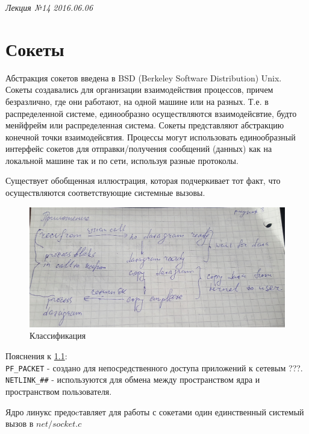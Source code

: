 \clearpage
\begin{flushright}
	\textit{Лекция №14}
	\textit{2016.06.06}
\end{flushright}

\chapter{Сокеты}

Абстракция сокетов введена в BSD (Berkeley Software Distribution) Unix. Сокеты создавались для организации взаимодействия процессов, причем безразлично, где они работают, на одной машине или на разных. Т.е. в распределенной системе, единообразно осуществляются взаимодейсвтие, будто менйфрейм или распределенная система. Сокеты представляют абстракцию конечной точки взаимодейсвтия. Процессы могут использовать единообразный интерфейс сокетов для отправки/получения сообщений (данных) как на локальной машине так и по сети, используя разные протоколы. 

Существует обобщенная иллюстрация, которая подчеркивает тот факт, что осуществляются соответствующие системные вызовы.

 

\begin{figure}[H]
  \centering
  \includegraphics[width=\textwidth]{pic/1.png}
  \caption{Классификация}
  \label{pic_class_sockets}
\end{figure}

Пояснения к \ref{pic_class_sockets}:\\ 
\verb|PF_PACKET| - создано для непосредственного доступа приложений к сетевым ???. \\
\verb|NETLINK_##| - используются для обмена между пространством ядра и пространством пользователя.

Ядро линукс предоcтавляет для работы с сокетами один единственный системый вызов в $net/socket.c$

